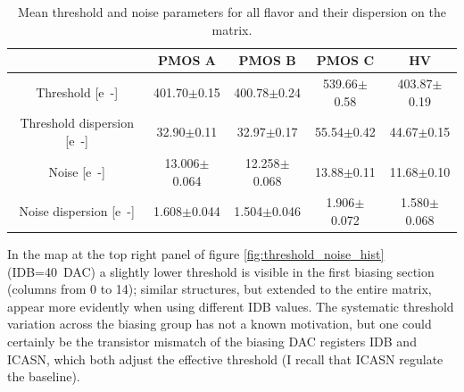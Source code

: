         \begin{table}
            \begin{center}
            \begin{tabular}{| c |  c | c | c |c |}
            \hline
            & PMOS A & PMOS B & PMOS C & HV \\
            \hline
            \hline
            Threshold [\si{e-}] & 401.70$\pm$0.15 & 400.78$\pm$0.24 & 539.66$\pm$0.58 &  403.87$\pm$0.19\\
            Threshold dispersion [\si{e-}] & 32.90$\pm$0.11 & 32.97$\pm$0.17 & 55.54$\pm$0.42 & 44.67$\pm$0.15\\
            Noise [\si{e-}] & 13.006$\pm$0.064 & 12.258$\pm$0.068 & 13.88$\pm$0.11 & 11.68$\pm$0.10\\
            Noise dispersion [\si{e-}] & 1.608$\pm$0.044 & 1.504$\pm$0.046 & 1.906$\pm$0.072 & 1.580$\pm$0.068\\
            \hline
            \end{tabular}
            \caption{Mean threshold and noise parameters for all flavor and their dispersion on the matrix. }
            \label{tab:threshold_noise_param}
            \end{center}
        \end{table}       
        
        In the map at the top right panel of figure \ref{fig:threshold_noise_hist} (IDB=\SI{40}{DAC}) a slightly lower threshold is visible in the first biasing section (columns from 0 to 14); similar structures, but extended to the entire matrix, appear more evidently when using different IDB values. 
        The systematic threshold variation across the biasing group has not a known motivation, but one could certainly be the transistor mismatch of the biasing DAC registers IDB and ICASN, which both adjust the effective threshold (I recall that ICASN regulate the baseline).

